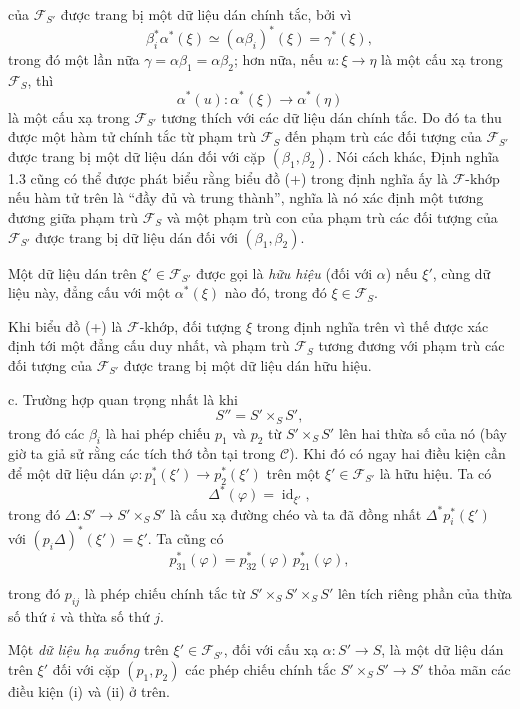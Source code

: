 của $\mathcal F_{S'}$ được trang bị một dữ liệu dán chính tắc, bởi vì
\[
  \beta_i^*\alpha^*(\xi)\simeq(\alpha\beta_i)^*(\xi)=\gamma^*(\xi),
\]
trong đó một lần nữa $\gamma=\alpha\beta_1=\alpha\beta_2$; hơn nữa, nếu
$u:\xi\longrightarrow\eta$ là một cấu xạ trong $\mathcal F_S$, thì
\[
  \alpha^*(u):\alpha^*(\xi)\longrightarrow\alpha^*(\eta)
\]
là một cấu xạ trong $\mathcal F_{S'}$ tương thích với các dữ liệu dán chính
tắc. Do đó ta thu được một hàm tử chính tắc từ phạm trù $\mathcal F_S$ đến
phạm trù các đối tượng của $\mathcal F_{S'}$ được trang bị một dữ liệu dán đối
với cặp $(\beta_1,\beta_2)$. Nói cách khác, Định nghĩa 1.3 cũng có thể được
phát biểu rằng biểu đồ (+) trong định nghĩa ấy là $\mathcal F$-khớp nếu hàm tử
trên là ``đầy đủ và trung thành'', nghĩa là nó xác định một tương đương giữa
phạm trù $\mathcal F_S$ và một phạm trù con của phạm trù các đối tượng
của $\mathcal F_{S'}$ được trang bị dữ liệu dán đối với
$(\beta_1,\beta_2)$.

 Một dữ liệu dán trên
$\xi'\in\mathcal F_{S'}$ được gọi là \emph{hữu hiệu} (đối với $\alpha$) nếu
$\xi'$, cùng dữ liệu này, đẳng cấu với một $\alpha^*(\xi)$ nào đó, trong đó
$\xi\in\mathcal F_S$.

Khi biểu đồ (+) là $\mathcal F$-khớp, đối tượng $\xi$ trong định nghĩa trên vì
thế được xác định tới một đẳng cấu duy nhất, và phạm trù
$\mathcal F_S$ tương đương với phạm trù các đối tượng của
$\mathcal F_{S'}$ được trang bị một dữ liệu dán hữu hiệu.

\medskip\noindent
c. Trường hợp quan trọng nhất là khi
\[
  S''=S'\times_S S',
\]
trong đó các $\beta_i$ là hai phép chiếu $p_1$ và $p_2$ từ
$S'\times_S S'$ lên hai thừa số của nó (bây giờ ta giả sử rằng các tích thớ tồn
tại trong $\mathcal C$). Khi đó có ngay hai điều kiện cần để một dữ liệu dán
$\varphi:p_1^*(\xi')\longrightarrow p_2^*(\xi')$ trên một
$\xi'\in\mathcal F_{S'}$ là hữu hiệu. Ta có
\[
  \tag{i}
  \Delta^*(\varphi)=\operatorname{id}_{\xi'},
\]
trong đó $\Delta:S'\longrightarrow S'\times_S S'$ là cấu xạ đường chéo và ta
đã đồng nhất $\Delta^*p_i^*(\xi')$ với
$(p_i\Delta)^*(\xi')=\xi'$. Ta cũng có
\[
  \tag{ii}
  p_{31}^*(\varphi)=p_{32}^*(\varphi)\,p_{21}^*(\varphi),
\]

trong đó $p_{ij}$ là phép chiếu chính tắc từ
$S'\times_S S'\times_S S'$ lên tích riêng phần của thừa số thứ $i$ và thừa số
thứ $j$.

 Một \emph{dữ liệu hạ xuống} trên
$\xi'\in\mathcal F_{S'}$, đối với cấu xạ
$\alpha:S'\longrightarrow S$, là một dữ liệu dán trên $\xi'$ đối với cặp
$(p_1,p_2)$ các phép chiếu chính tắc
$S'\times_S S'\longrightarrow S'$ thỏa mãn các điều kiện (i) và (ii) ở trên.

